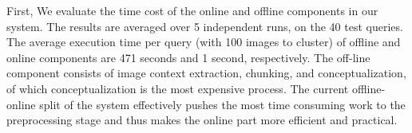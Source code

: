 First, We evaluate the time cost of the online and offline components
in our system. The results are averaged over 5 independent
runs, on the 40 test queries. The average execution time per query
(with 100 images to cluster) of offline and online components are
471 seconds and 1 second, respectively.
The off-line component consists of image context extraction,
chunking, and conceptualization, of which
conceptualization is the most expensive process.
The current offline-online split of the system effectively pushes the most
time consuming work to the preprocessing stage and thus
makes the online part more efficient and practical.

